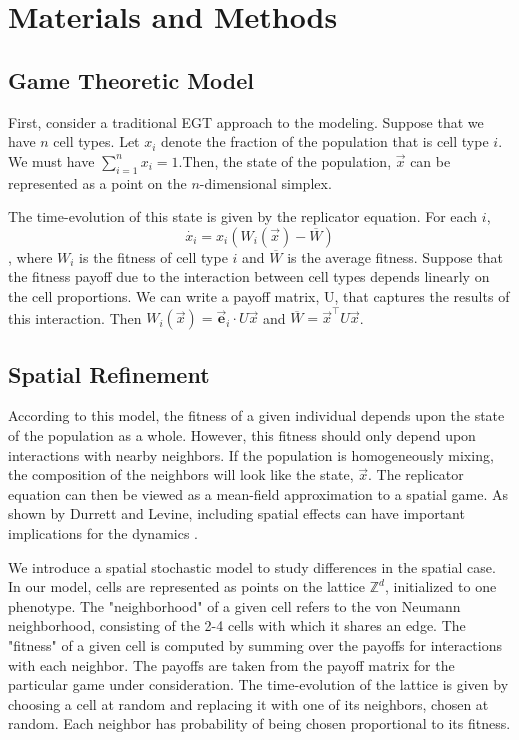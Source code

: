 \documentclass[12pt]{amsart}
\begin{document}
\section{Materials and Methods}
\subsection{Game Theoretic Model}
	First, consider a traditional EGT approach to the modeling. Suppose that we have $n$ cell types. Let $x_i$ denote the fraction of the population that is cell type $i$. We must have $\sum_{i=1}^n x_i = 1$.Then, the state of the population, $\vec{x}$ can be represented as a point on the $n$-dimensional simplex. 
	
	The time-evolution of this state is given by the replicator equation. For each $i$, $$\dot{x_i} = x_i (W_i(\vec{x}) - \overline{W})$$, where $W_i$ is the fitness of cell type $i$ and $\overline{W}$ is the average fitness. Suppose that the fitness payoff due to the interaction between cell types depends linearly on the cell proportions. We can write a payoff matrix, U, that captures the results of this interaction. Then $W_i(\vec{x}) = \vec{\textbf{e}}_i \cdot U\vec{x} $ and $\overline{W} = \vec{x}^\top U \vec{x}$.
	
\subsection{Spatial Refinement}



According to this model, the fitness of a given individual depends upon the state of the population as a whole. However, this fitness should only depend upon interactions with nearby neighbors. If the population is homogeneously mixing, the composition of the neighbors will look like the state, $ \vec{x} $. The replicator equation can then be viewed as a mean-field approximation to a spatial game. As shown by Durrett and Levine, including spatial effects can have important implications for the dynamics \cite{Durrett1994}.

We introduce a spatial stochastic model to study differences in the spatial case. In our model, cells are represented as points on the lattice $\mathbb{Z}^d$, initialized to one phenotype. The "neighborhood" of a given cell refers to the von Neumann neighborhood, consisting of the 2-4 cells with which it shares an edge. The "fitness" of a given cell is computed by summing over the payoffs for interactions with each neighbor. The payoffs are taken from the payoff matrix for the particular game under consideration. The time-evolution of the lattice is given by choosing a cell at random and replacing it with one of its neighbors, chosen at random. Each neighbor has probability of being chosen proportional to its fitness. 
\end{document}
